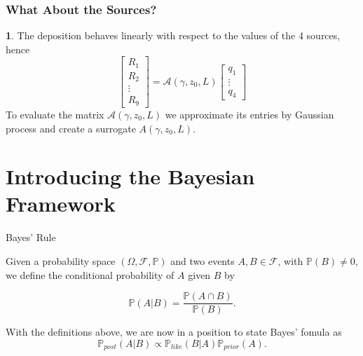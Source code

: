 \documentclass[11pt]{beamer}
\theoremstyle{plain}
\theoremstyle{definition}
\newtheorem{dfn}{}[section]
\newcommand{\p}{\mathbb{P}}
\newcommand{\like}{\p_{like}}
\newcommand{\prior}{\p_{prior}}
\newcommand{\post}{\p_{post}}
\begin{document}
\begin{frame}
\frametitle{What About the Sources?}

\begin{dfn}
The deposition behaves linearly  with respect to the values of the 4  sources,
hence
\begin{equation*}
\begin{bmatrix}
R_{1} \\
R_{2} \\
\vdots\\
R_{9}
\end{bmatrix}=\mathcal{A}(\gamma,z_{0},L)
\begin{bmatrix}
q_{1}\\
\vdots\\
q_{4}
\end{bmatrix}
\end{equation*}
To evaluate the matrix $\mathcal{A}(\gamma,z_{0},L)$ we approximate its entries by Gaussian process
and create a surrogate $A(\gamma,z_{0},L)$.
\end{dfn}
\end{frame}



\section{Introducing the Bayesian Framework}

\begin{frame}{Bayes' Rule}

Given a probability space $(\Omega,\mathscr{F},\p)$ and two events $A,B\in\mathscr{F}$, with $\p(B)\neq 0$,
we define the conditional probability of $A$ given $B$ by

\begin{equation*}
\p(A|B)=\frac{\p(A\cap B)}{\p(B)}.
\end{equation*}


With the definitions above, we are now in a position to state Bayes' fomula as
\begin{equation}\label{eqnBayes}
\post(A|B)\propto\like(B|A)\prior(A).
\end{equation}

\end{frame}
\end{document}
